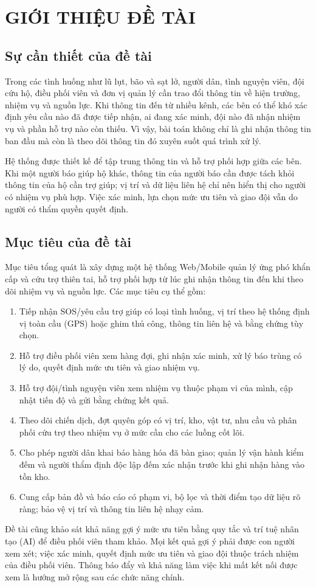 \documentclass[12pt,a4paper,oneside]{report}
\begin{document}
\chapter{GIỚI THIỆU ĐỀ TÀI}\label{ch:introduction}
\section{Sự cần thiết của đề tài}
Trong các tình huống như lũ lụt, bão và sạt lở, người dân, tình nguyện viên, đội cứu hộ, điều phối viên và đơn vị quản lý cần trao đổi thông tin về hiện trường, nhiệm vụ và nguồn lực. Khi thông tin đến từ nhiều kênh, các bên có thể khó xác định yêu cầu nào đã được tiếp nhận, ai đang xác minh, đội nào đã nhận nhiệm vụ và phần hỗ trợ nào còn thiếu. Vì vậy, bài toán không chỉ là ghi nhận thông tin ban đầu mà còn là theo dõi thông tin đó xuyên suốt quá trình xử lý.

Hệ thống được thiết kế để tập trung thông tin và hỗ trợ phối hợp giữa các bên. Khi một người báo giúp hộ khác, thông tin của người báo cần được tách khỏi thông tin của hộ cần trợ giúp; vị trí và dữ liệu liên hệ chỉ nên hiển thị cho người có nhiệm vụ phù hợp. Việc xác minh, lựa chọn mức ưu tiên và giao đội vẫn do người có thẩm quyền quyết định.

\section{Mục tiêu của đề tài}
Mục tiêu tổng quát là xây dựng một hệ thống Web/Mobile quản lý ứng phó khẩn cấp và cứu trợ thiên tai, hỗ trợ phối hợp từ lúc ghi nhận thông tin đến khi theo dõi nhiệm vụ và nguồn lực. Các mục tiêu cụ thể gồm:
\begin{enumerate}
  \item Tiếp nhận SOS/yêu cầu trợ giúp có loại tình huống, vị trí theo hệ thống định vị toàn cầu (GPS) hoặc ghim thủ công, thông tin liên hệ và bằng chứng tùy chọn.
  \item Hỗ trợ điều phối viên xem hàng đợi, ghi nhận xác minh, xử lý báo trùng có lý do, quyết định mức ưu tiên và giao nhiệm vụ.
  \item Hỗ trợ đội/tình nguyện viên xem nhiệm vụ thuộc phạm vi của mình, cập nhật tiến độ và gửi bằng chứng kết quả.
  \item Theo dõi chiến dịch, đợt quyên góp có vị trí, kho, vật tư, nhu cầu và phân phối cứu trợ theo nhiệm vụ ở mức cần cho các luồng cốt lõi.
  \item Cho phép người dân khai báo hàng hóa đã bàn giao; quản lý vận hành kiểm đếm và người thẩm định độc lập đếm xác nhận trước khi ghi nhận hàng vào tồn kho.
  \item Cung cấp bản đồ và báo cáo có phạm vi, bộ lọc và thời điểm tạo dữ liệu rõ ràng; bảo vệ vị trí và thông tin liên hệ nhạy cảm.
\end{enumerate}
Đề tài cũng khảo sát khả năng gợi ý mức ưu tiên bằng quy tắc và trí tuệ nhân tạo (AI) để điều phối viên tham khảo. Mọi kết quả gợi ý phải được con người xem xét; việc xác minh, quyết định mức ưu tiên và giao đội thuộc trách nhiệm của điều phối viên. Thông báo đẩy và khả năng làm việc khi mất kết nối được xem là hướng mở rộng sau các chức năng chính.
\end{document}
